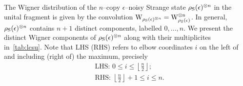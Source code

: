 The Wigner distribution of the $n$--copy $\epsilon$--noisy Strange state $\rho_{\rm{S}}(\epsilon)^{\otimes n}$ in the unital fragment is given by the convolution $\W{\rho_{\rm{S}}(\epsilon)^{\otimes n}} = \rm{W}_{\rho_{\rm{S}}(\epsilon)}^{\otimes n}$.
In general, $\rho_{\rm{S}}(\epsilon)^{\otimes n}$ contains $n + 1$ distinct components, labelled $0,\dots, n$.
We present the distinct Wigner components of $\rho_{\rm{S}}(\epsilon)^{\otimes n}$ along with their multiplicites in~\cref{tab:lcsu}.
Note that LHS (RHS) refers to elbow coordinates $i$ on the left of and including (right of) the maximum, precisely
\begin{align}
&\text{LHS: } 0 \leq i \leq \left\lfloor \frac{n}{2} \right\rfloor ; \\
&\text{RHS: } \left\lfloor \frac{n}{2} \right\rfloor +1 \leq i \leq n.
\end{align}
